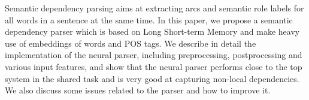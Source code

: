 Semantic dependency parsing aims at extracting arcs and semantic role labels for all words in a sentence at the same time. In this paper, we propose a semantic dependency parser which is based on Long Short-term Memory and make heavy use of embeddings of words and POS tags. We describe in detail the implementation of the neural parser, including preprocessing, postprocessing and various input features, and show that the neural parser performs close to the top system in the shared task and is very good at capturing non-local dependencies. We also discuss some issues related to the parser and how to improve it.
